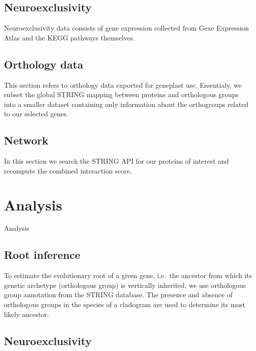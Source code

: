 \documentclass[
]{article}
\begin{document}
\hypertarget{neuroexclusivity}{%
\subsection{Neuroexclusivity}\label{neuroexclusivity}}

Neuroexclusivity data consists of gene expression collected from Gexe
Expression Atlas and the KEGG pathways themselves.


\hypertarget{orthology-data}{%
\subsection{Orthology data}\label{orthology-data}}

This section refers to orthology data exported for geneplast use.
Essentialy, we subset the global STRING mapping between proteins and
orthologous groups into a smaller dataset containing only information
about the orthogroups related to our selected genes.


\hypertarget{network}{%
\subsection{Network}\label{network}}

In this section we search the STRING API for our proteins of interest
and recompute the combined interaction score.


\hypertarget{analysis}{%
\section{Analysis}\label{analysis}}

Analysis

\hypertarget{root-inference}{%
\subsection{Root inference}\label{root-inference}}

To estimate the evolutionary root of a given gene, i.e.~the ancestor
from which its genetic archetype (orthologous group) is vertically
inherited, we use orthologous group annotation from the STRING database.
The presence and absence of orthologous groups in the species of a
cladogram are used to determine its most likely ancestor.


\hypertarget{neuroexclusivity-1}{%
\subsection{Neuroexclusivity}\label{neuroexclusivity-1}}
\end{document}
